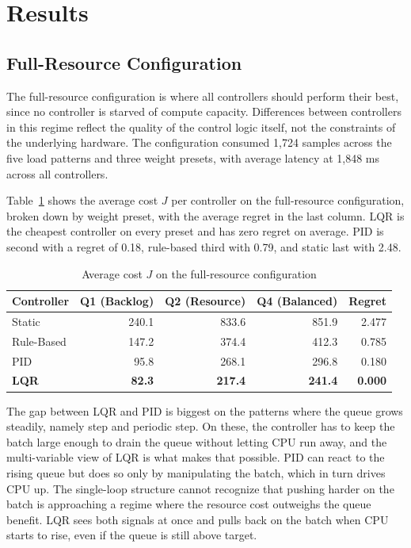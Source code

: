 \documentclass[10pt,a4paper]{article}
\begin{document}
\section{Results}

\subsection{Full-Resource Configuration}

The full-resource configuration is where all controllers should perform their best, since no controller is starved of compute capacity. Differences between controllers in this regime reflect the quality of the control logic itself, not the constraints of the underlying hardware. The configuration consumed 1{,}724 samples across the five load patterns and three weight presets, with average latency at 1{,}848 ms across all controllers.

Table~\ref{tab:cost-full} shows the average cost $J$ per controller on the full-resource configuration, broken down by weight preset, with the average regret in the last column. LQR is the cheapest controller on every preset and has zero regret on average. PID is second with a regret of 0.18, rule-based third with 0.79, and static last with 2.48.

\begin{table}[H]
\centering
\caption{Average cost $J$ on the full-resource configuration}
\label{tab:cost-full}
\begin{tabular}{lrrrr}
\toprule
\textbf{Controller} & \textbf{Q1 (Backlog)} & \textbf{Q2 (Resource)} & \textbf{Q4 (Balanced)} & \textbf{Regret} \\
\midrule
Static     & 240.1 & 833.6 & 851.9 & 2.477 \\
Rule-Based & 147.2 & 374.4 & 412.3 & 0.785 \\
PID        & 95.8  & 268.1 & 296.8 & 0.180 \\
\textbf{LQR} & \textbf{82.3} & \textbf{217.4} & \textbf{241.4} & \textbf{0.000} \\
\bottomrule
\end{tabular}
\end{table}

The gap between LQR and PID is biggest on the patterns where the queue grows steadily, namely step and periodic step. On these, the controller has to keep the batch large enough to drain the queue without letting CPU run away, and the multi-variable view of LQR is what makes that possible. PID can react to the rising queue but does so only by manipulating the batch, which in turn drives CPU up. The single-loop structure cannot recognize that pushing harder on the batch is approaching a regime where the resource cost outweighs the queue benefit. LQR sees both signals at once and pulls back on the batch when CPU starts to rise, even if the queue is still above target.
\end{document}
